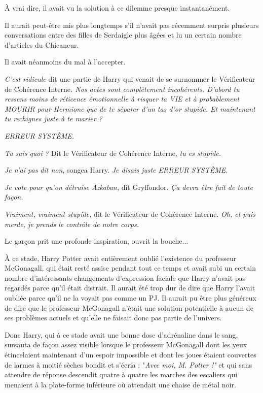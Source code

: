 À vrai dire, il avait vu la solution à ce dilemme presque instantanément.

Il aurait peut-être mis plus longtemps s'il n'avait pas récemment surpris plusieurs conversations entre des filles de Serdaigle plus âgées et lu un certain nombre d'articles du Chicaneur.

Il avait néanmoins du mal à l'accepter.

\emph{C'est ridicule}  dit une partie de Harry qui venait de se surnommer le Vérificateur de Cohérence Interne\emph{. Nos actes sont complètement incohérents. D'abord tu ressens moins de réticence émotionnelle à risquer ta VIE et à probablement MOURIR pour Hermione que de te séparer d'un tas d'or stupide. Et maintenant tu rechignes juste à te marier ?} 

\emph{ERREUR SYSTÈME.} 

\emph{Tu sais quoi ? } Dit le Vérificateur de Cohérence Interne, \emph{tu es stupide.} 

\emph{Je n'ai pas dit non, } songea Harry. \emph{Je disais juste ERREUR SYSTÈME.} 

\emph{Je vote pour qu'on détruise Azkaban, } dit Gryffondor. \emph{Ça devra être fait de toute façon.} 

\emph{Vraiment, vraiment stupide, } dit le Vérificateur de Cohérence Interne. \emph{Oh, et puis merde, je prends le contrôle de notre corps.} 

Le garçon prit une profonde inspiration, ouvrit la bouche...

À ce stade, Harry Potter avait entièrement oublié l'existence du professeur McGonagall, qui était resté assise pendant tout ce temps et avait subi un certain nombre d'intéressants changements d'expression faciale que Harry n'avait pas regardés parce qu'il était distrait. Il aurait été trop dur de dire que Harry l'avait oubliée parce qu'il ne la voyait pas comme un PJ. Il aurait pu être plus généreux de dire que le professeur McGonagall n'était une solution potentielle à aucun de ses problèmes actuels et qu'elle ne faisait donc pas partie de l'univers.

Donc Harry, qui à ce stade avait une bonne dose d'adrénaline dans le sang, sursauta de façon assez visible lorsque le professeur McGonagall dont les yeux étincelaient maintenant d'un espoir impossible et dont les joues étaient couvertes de larmes à moitié sèches bondit et s'écria : "\emph{Avec moi, M. Potter !" } et qui sans attendre de réponse descendit quatre à quatre les marches des escaliers qui menaient à la plate-forme inférieure où attendait une chaise de métal noir.

